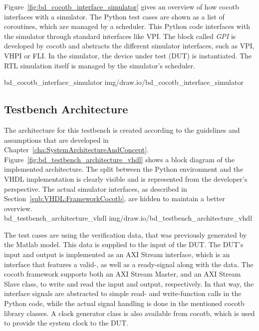 Figure~\ref{fig:bd_cocotb_interface_simulator} gives an overview of how cocotb interfaces with a simulator.
The Python test cases are shown as a list of coroutines, which are managed by a scheduler.
This Python code interfaces with the simulator through standard interfaces like VPI.
The block called \textit{GPI} is developed by cocotb and abstracts the different simulator interfaces, such as VPI, VHPI or FLI.
In the simulator, the device under test (DUT) is instantiated.
The RTL simulation itself is managed by the simulator's scheduler.

 {bd_cocotb_interface_simulator} {img/draw.io/bd_cocotb_interface_simulator}

\subsection{Testbench Architecture}
\label{sub:VHDL:TestbenchArchitecture}

The architecture for this testbench is created according to the guidelines and assumptions that are developed in Chapter~\ref{cha:SystemArchitectureAndConcept}.\\

Figure~\ref{fig:bd_testbench_architecture_vhdl} shows a block diagram of the implemented architecture.
The split between the Python environment and the VHDL implementation is clearly visible and is represented from the developer's perspective.
The actual simulator interfaces, as described in Section~\ref{sub:VHDL:FrameworkCocotb}, are hidden to maintain a better overview.\\

 {bd_testbench_architecture_vhdl} {img/draw.io/bd_testbench_architecture_vhdl}

The test cases are using the verification data, that was previously generated by the Matlab model.
This data is supplied to the input of the DUT.
The DUT's input and output is implemented as an AXI Stream interface, which is an interface that features a valid-, as well as a ready-signal along with the data.
The cocotb framework supports both an AXI Stream Master, and an AXI Stream Slave class, to write and read the input and output, respectively.
In that way, the interface signals are abstracted to simple read- and write-function calls in the Python code, while the actual signal handling is done in the mentioned cocotb library classes.
A clock generator class is also available from cocotb, which is used to provide the system clock to the DUT.\\

